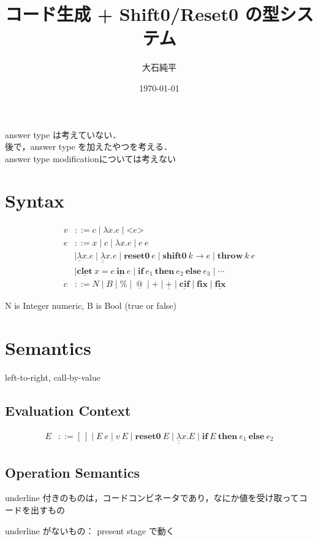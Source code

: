 \documentclass[10pt,a4j]{jarticle}
\title{コード生成 + Shift0/Reset0 の型システム}
\date{\today}
\author{大石純平}
\makeatletter
\newcommand\fun[2]{\lambda{#1}.{#2}}
\newcommand\Resetz{\textbf{reset0}}
\newcommand\Shiftz{\textbf{shift0}}
\newcommand\Throw{\textbf{throw}}
\newcommand\resetz[1]{\Resetz~{#1}}
\newcommand\shiftz[2]{\Shiftz~{#1}\to{#2}}
\newcommand\throw[2]{\Throw~{#1}~{#2}}
\newcommand\cfun[2]{\underline{\lambda}{#1}.{#2}}
\newcommand\ccfun[2]{\underline{\underline{\lambda}}{#1}.{#2}}
\newcommand\cPlus{\underline{\textbf{+}}}
\newcommand\cLet{\underline{\textbf{clet}}}
\newcommand\cIn{\underline{\textbf{in}}}
\newcommand\clet[3]{\cLet~{#1}={#2}~\cIn~{#3}}
\newcommand\csp[1]{\texttt{\%}{#1}}
\newcommand\code[1]{\texttt{<}{#1}\texttt{>}}
\newcommand\ift[3]{\textbf{if}~{#1}~\textbf{then}~{#2}~\textbf{else}~{#3}}
\newcommand\cIf{\underline{\textbf{cif}}}
\newcommand\fix{\textbf{fix}}
\newcommand\cfix{\underline{\textbf{fix}}}
\newcommand\cat{~\underline{@}~}
\theoremstyle{break}
\makeatother
\begin{document}
\maketitle

answer type は考えていない．\\
後で，answer type を加えたやつを考える．\\
answer type modificationについては考えない

\section{Syntax}
\begin{align*}
  v & ::= c \mid \fun{x}{e} \mid \code{e} \\
  e & ::=  x \mid c \mid \fun{x}{e} \mid e~e \\
    & \mid \cfun{x}{e}
      \mid \ccfun{x}{e}
      \mid \resetz{e}
      \mid \shiftz{k}{e}
      \mid \throw{k}{e} \\
    & \mid \clet{x}{e}{e}
      \mid \ift{e_1}{e_2}{e_3}
      \mid \cdots \\
  c & ::= N \mid B \mid \csp \mid \cat \mid + \mid \cPlus \mid \cIf \mid \fix \mid \cfix
\end{align*}


N is Integer numeric, B is Bool (true or false)

\section{Semantics}
left-to-right, call-by-value

\subsection{Evaluation Context}

\begin{align*}
  E & ::= [~] \mid E~ e \mid v~ E \mid \Resetz~ E \mid \ccfun{x}{E} \mid \ift{E}{e_1}{e_2}
\end{align*}

\subsection{Operation Semantics}
underline 付きのものは，コードコンビネータであり，なにか値を受け取ってコードを出すもの

underline がないもの： present stage で動く
\end{document}
